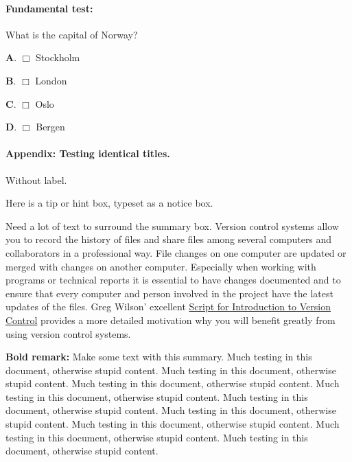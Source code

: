 \documentclass[%
oneside,                 %
final,                   %
10pt]{article}
\newenvironment{doconcequiz}{}{}
\newenvironment{notice_mdfboxadmon}[1][]{
\begin{notice_mdfboxmdframed}[frametitle=#1]
}
{
\end{notice_mdfboxmdframed}
}
\newenvironment{summary_mdfboxadmon}[1][]{
\begin{summary_mdfboxmdframed}[frametitle=#1]
}
{
\end{summary_mdfboxmdframed}
}
\theoremstyle{definition}
\begin{document}
\begin{enumerate}
\begin{doconcequiz}
\paragraph{Fundamental test:}
What is the capital of Norway?

\vspace{2mm}

\textbf{A}. $\Box$ 
Stockholm

\textbf{B}. $\Box$ 
London

\textbf{C}. $\Box$ 
Oslo

\textbf{D}. $\Box$ 
Bergen



\vspace{3mm}

\end{doconcequiz}



\paragraph{Appendix: Testing identical titles.}
Without label.


\begin{notice_mdfboxadmon}[Tip.]
Here is a tip or hint box, typeset as a notice box.
\end{notice_mdfboxadmon} %



\clearpage

Need a lot of text to surround the summary box.
Version control systems allow you to record the history of files
and share files among several computers and collaborators in a
professional way. File changes on one computer are updated or
merged with changes on another computer. Especially when working
with programs or technical reports it is essential
to have changes documented and to
ensure that every computer and person involved in the project
have the latest updates of the files.
Greg Wilson' excellent \href{{https://software-carpentry.org/2010/07/script-for-introduction-to-version-control/}}{Script for Introduction to Version Control} provides a more detailed motivation why you will benefit greatly
from using version control systems.


\begin{summary_mdfboxadmon}[Summary.]
\textbf{Bold remark:} Make some text with this summary.
Much testing in this document, otherwise stupid content.
Much testing in this document, otherwise stupid content.
Much testing in this document, otherwise stupid content.
Much testing in this document, otherwise stupid content.
Much testing in this document, otherwise stupid content.
Much testing in this document, otherwise stupid content.
Much testing in this document, otherwise stupid content.
Much testing in this document, otherwise stupid content.
Much testing in this document, otherwise stupid content.
\end{summary_mdfboxadmon} %




\end{enumerate}
\end{document}
